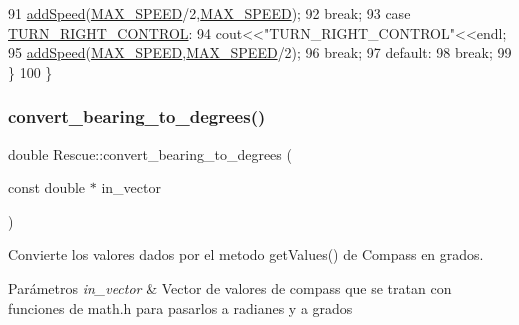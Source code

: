 \begin{DoxyCode}
91                 \hyperlink{classRescue_a9a430924f65d71eca4e02dc9b2704947_a9a430924f65d71eca4e02dc9b2704947}{addSpeed}(\hyperlink{Rescue_8h_ac2cd96d53dd3ba6407db6766c3d92b26_ac2cd96d53dd3ba6407db6766c3d92b26}{MAX\_SPEED}/2,\hyperlink{Rescue_8h_ac2cd96d53dd3ba6407db6766c3d92b26_ac2cd96d53dd3ba6407db6766c3d92b26}{MAX\_SPEED});
92                 \textcolor{keywordflow}{break};
93             \textcolor{keywordflow}{case} \hyperlink{classRescue_ab44ced9ce57b1b0d19b5456cd952d702_ab44ced9ce57b1b0d19b5456cd952d702ae5a7150c4e173fcb6aaf1d2082bf0081}{TURN\_RIGHT\_CONTROL}:
94                 cout<<\textcolor{stringliteral}{"TURN\_RIGHT\_CONTROL"}<<endl;
95                 \hyperlink{classRescue_a9a430924f65d71eca4e02dc9b2704947_a9a430924f65d71eca4e02dc9b2704947}{addSpeed}(\hyperlink{Rescue_8h_ac2cd96d53dd3ba6407db6766c3d92b26_ac2cd96d53dd3ba6407db6766c3d92b26}{MAX\_SPEED},\hyperlink{Rescue_8h_ac2cd96d53dd3ba6407db6766c3d92b26_ac2cd96d53dd3ba6407db6766c3d92b26}{MAX\_SPEED}/2);
96                 \textcolor{keywordflow}{break};
97             \textcolor{keywordflow}{default}:
98                 \textcolor{keywordflow}{break};
99         \}
100 \}
\end{DoxyCode}
\mbox{\label{classRescue_ac0d22bd4b26374b9eba3a229397b08a2_ac0d22bd4b26374b9eba3a229397b08a2}} 
\subsubsection{\texorpdfstring{convert\+\_\+bearing\+\_\+to\+\_\+degrees()}{convert\_bearing\_to\_degrees()}}
{\footnotesize\ttfamily double Rescue\+::convert\+\_\+bearing\+\_\+to\+\_\+degrees (\begin{DoxyParamCaption}\item[{const double $\ast$}]{in\+\_\+vector }\end{DoxyParamCaption})}



Convierte los valores dados por el metodo get\+Values() de Compass en grados. 


\begin{DoxyParams}{Parámetros}
{\em in\+\_\+vector} & Vector de valores de compass que se tratan con funciones de math.\+h para pasarlos a radianes y a grados \\
\hline
\end{DoxyParams}


